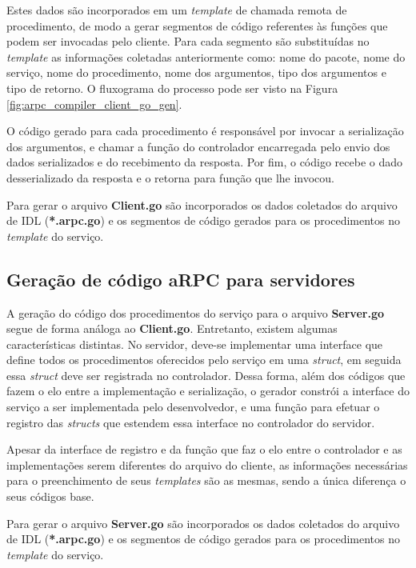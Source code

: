 Estes dados são incorporados em um \textit{template} de chamada remota de procedimento, de modo a gerar segmentos de código referentes às funções que podem ser invocadas pelo cliente. Para cada segmento são substituídas no \textit{template} as informações coletadas anteriormente como: nome do pacote, nome do serviço, nome do procedimento, nome dos argumentos, tipo dos argumentos e tipo de retorno. O fluxograma do processo pode ser visto na Figura \ref{fig:arpc_compiler_client_go_gen}. 

O código gerado para cada procedimento é responsável por invocar a serialização dos argumentos, e chamar a função do controlador encarregada pelo envio dos dados serializados e do recebimento da resposta. Por fim, o código recebe o dado desserializado da resposta e o retorna para função que lhe invocou.

Para gerar o arquivo \textbf{Client.go} são incorporados os dados coletados do arquivo de IDL (\textbf{*.arpc.go}) e os segmentos de código gerados para os procedimentos no \textit{template} do serviço.

\subsection{Geração de código aRPC para servidores}

A geração do código dos procedimentos do serviço para o arquivo \textbf{Server.go} segue de forma análoga ao \textbf{Client.go}. Entretanto, existem algumas características distintas. No servidor, deve-se implementar uma interface que define todos os procedimentos oferecidos pelo serviço em uma \textit{struct}, em seguida essa \textit{struct} deve ser registrada no controlador. Dessa forma, além dos códigos que fazem o elo entre a implementação e serialização, o gerador constrói a interface do serviço a ser implementada pelo desenvolvedor, e uma função para efetuar o registro das \textit{structs} que estendem essa interface no controlador do servidor.

Apesar da interface de registro e da função que faz o elo entre o controlador e as implementações serem diferentes do arquivo do cliente, as informações necessárias para o preenchimento de seus \textit{templates} são as mesmas, sendo a única diferença o seus códigos base.

Para gerar o arquivo \textbf{Server.go} são incorporados os dados coletados do arquivo de IDL (\textbf{*.arpc.go}) e os segmentos de código gerados para os procedimentos no \textit{template} do serviço.

